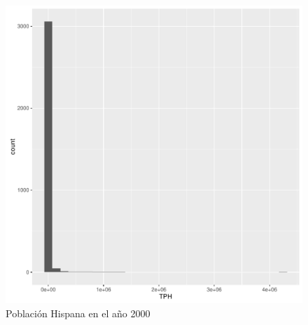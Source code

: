 \begin{figure}[H]
	\centering
\begin{knitrout}
\color{fgcolor}\begin{kframe}
\begin{alltt}
         \hlopt{+} \hlstd{()}
\end{alltt}
\end{kframe}
\includegraphics[width=\maxwidth]{figure/pobHisp2000-1} 

\end{knitrout}
	\caption{Población Hispana en el año 2000}
\end{figure}

